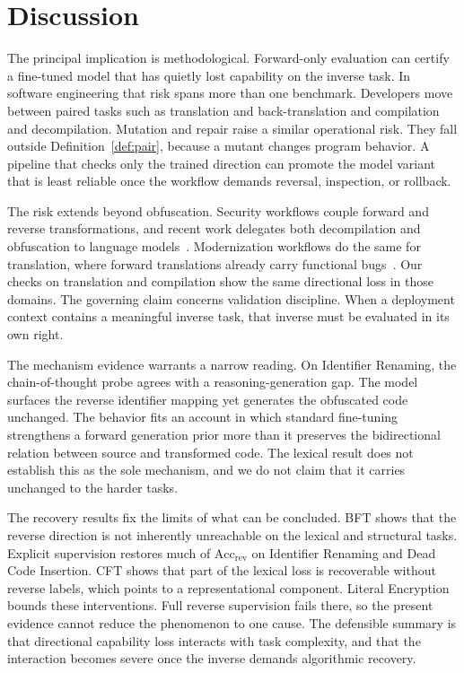 \section{Discussion}
\label{sec:discussion}

The principal implication is methodological. Forward-only evaluation can certify
a fine-tuned model that has quietly lost capability on the inverse task. In
software engineering that risk spans more than one benchmark. Developers move
between paired tasks such as translation and back-translation and compilation and
decompilation. Mutation and repair raise a similar operational risk.
They fall outside Definition~\ref{def:pair}, because a mutant changes program
behavior. A pipeline that checks only the trained direction can promote the model variant that is least reliable once the workflow demands reversal, inspection, or rollback.

The risk extends beyond obfuscation. Security workflows couple forward and
reverse transformations, and recent work delegates both decompilation and
obfuscation to language models~\cite{tan2024llm4decompile, mohseni2025obfuscate}.
Modernization workflows do the same for translation, where forward translations
already carry functional bugs~\cite{pan2024lost, eniser2024rust}. Our checks on
translation and compilation show the same directional loss in those domains. The
governing claim concerns validation discipline. When a deployment context
contains a meaningful inverse task, that inverse must be evaluated in its own
right.

The mechanism evidence warrants a narrow reading. On Identifier Renaming, the
chain-of-thought probe agrees with a reasoning-generation gap. The model surfaces
the reverse identifier mapping yet generates the obfuscated code unchanged. The
behavior fits an account in which standard fine-tuning strengthens a forward
generation prior more than it preserves the bidirectional relation between source
and transformed code. The lexical result does not establish this as the sole
mechanism, and we do not claim that it carries unchanged to the harder tasks.

The recovery results fix the limits of what can be concluded. BFT shows that the
reverse direction is not inherently unreachable on the lexical and structural
tasks. Explicit supervision restores much of $\mathrm{Acc}_{\text{rev}}$ on
Identifier Renaming and Dead Code Insertion. CFT shows that part of the lexical
loss is recoverable without reverse labels, which points to a representational
component. Literal Encryption bounds these interventions. Full reverse
supervision fails there, so the present evidence cannot reduce the phenomenon to
one cause. The defensible summary is that directional capability loss interacts
with task complexity, and that the interaction becomes severe once the inverse
demands algorithmic recovery.

